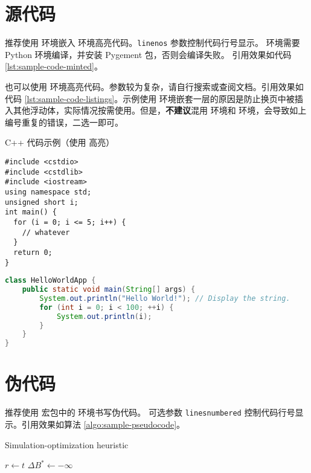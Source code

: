 \section{源代码}

推荐使用  环境嵌入  环境高亮代码。\verb|linenos| 参数控制代码行号显示。 环境需要 Python 环境编译，并安装 Pygement 包，否则会编译失败。
引用效果如代码 \ref{lst:sample-code-minted}。

也可以使用  环境高亮代码。参数较为复杂，请自行搜索或查阅文档。引用效果如代码 \ref{lst:sample-code-listings}。示例使用  环境嵌套一层的原因是防止换页中被插入其他浮动体，实际情况按需使用。但是，\textbf{不建议}混用  环境和  环境，会导致如上编号重复的错误，二选一即可。

\begin{listing}[!ht]
\caption{C++ 代码示例（使用  高亮）}
\label{lst:sample-code-minted}
\begin{verbatim}
#include <cstdio>
#include <cstdlib>
#include <iostream>
using namespace std;
unsigned short i;
int main() {
  for (i = 0; i <= 5; i++) {
    // whatever
  }
  return 0;
}
\end{verbatim}
\end{listing}

\noindent%
\begin{minipage}{\linewidth}
\begin{lstlisting}[language=java,caption={Java 代码示例（使用 \pkg{listings} 高亮）},xleftmargin=20pt,label={lst:sample-code-listings}]
class HelloWorldApp {
    public static void main(String[] args) {
        System.out.println("Hello World!"); // Display the string.
        for (int i = 0; i < 100; ++i) {
            System.out.println(i);
        }
    }
}
\end{lstlisting}
\end{minipage}

\section{伪代码}


推荐使用  宏包中的  环境书写伪代码。 可选参数 \verb|linesnumbered| 控制代码行号显示。引用效果如算法 \ref{algo:sample-pseudocode}。

\begin{algorithm}
  \caption{Simulation-optimization heuristic}
  \label{algo:sample-pseudocode}
  $r\leftarrow t$\;
  $\Delta B^{\ast}\leftarrow -\infty$\;
\end{algorithm}
